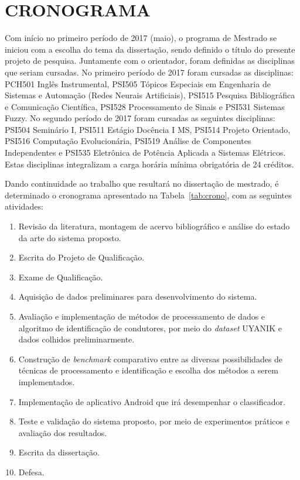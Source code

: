 \chapter{CRONOGRAMA}
\label{cap:crono}

Com início no primeiro período de 2017 (maio), o programa de Mestrado se iniciou com a escolha do tema da dissertação, sendo definido o título do presente projeto de pesquisa. Juntamente com o orientador, foram definidas as disciplinas que seriam cursadas. No primeiro período de 2017 foram cursadas as disciplinas: PCH501 Inglês Instrumental, PSI505 Tópicos Especiais em Engenharia de Sistemas e Automação (Redes Neurais Artificiais), PSI515 Pesquisa Bibliográfica e Comunicação Científica, PSI528 Processamento de Sinais e PSI531 Sistemas Fuzzy. No segundo período de 2017 foram cursadas as seguintes disciplinas: PSI504 Seminário I, PSI511 Estágio Docência I MS, PSI514 Projeto Orientado, PSI516 Computação Evolucionária, PSI519 Análise de Componentes Independentes e PSI535 Eletrônica de Potência Aplicada a Sistemas Elétricos. Estas disciplinas integralizam a carga horária mínima obrigatória de 24 créditos. 

Dando continuidade ao trabalho que resultará no dissertação de mestrado, é determinado o cronograma apresentado na Tabela~\ref{tab:crono}, com as seguintes atividades:

\begin{enumerate}
    \item Revisão da literatura, montagem de acervo bibliográfico e análise do estado da arte do sistema proposto.
    
    \item Escrita do Projeto de Qualificação.
    
    \item Exame de Qualificação.
    
    \item Aquisição de dados preliminares para desenvolvimento do sistema.
    
    \item Avaliação e implementação de métodos de processamento de dados e algoritmo de identificação de condutores, por meio do \textit{dataset} UYANIK e dados colhidos preliminarmente.
    
    \item Construção de \textit{benchmark} comparativo entre as diversas possibilidades de técnicas de processamento e identificação e escolha dos métodos a serem implementados.
    
    \item Implementação de aplicativo Android que irá desempenhar o classificador.
    
    \item Teste e validação do sistema proposto, por meio de experimentos práticos e avaliação dos resultados.
    
    \item Escrita da dissertação.
    
    \item Defesa.
    
\end{enumerate}

